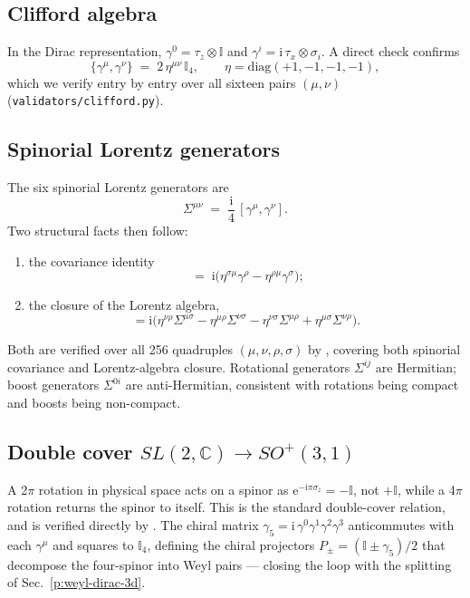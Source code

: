 \documentclass[a4paper,onecolumn,11pt]{quantumarticle}
\newcommand{\ii}{\ensuremath{\mathrm{i}}}
\newcommand{\bbI}{\ensuremath{\mathbb{I}}}
\newcommand{\bbC}{\ensuremath{\mathbb{C}}}
\begin{document}
\subsection{Clifford algebra}
In the Dirac representation, $\gamma^{0} = \tau_{z}\otimes\bbI$ and
$\gamma^{i} = \ii\,\tau_{x}\otimes\sigma_{i}$. A direct check confirms
\begin{equation}
\{\gamma^{\mu},\gamma^{\nu}\}\;=\;2\,\eta^{\mu\nu}\,\bbI_{4} ,
\qquad \eta=\mathrm{diag}(+1,-1,-1,-1) ,
\label{p:eq:clifford}
\end{equation}
which we verify entry by entry over all sixteen pairs $(\mu,\nu)$
(\texttt{validators/clifford.py}).

\subsection{Spinorial Lorentz generators}
The six spinorial Lorentz generators are
\begin{equation}
\Sigma^{\mu\nu} \;=\; \frac{\ii}{4}\,[\gamma^{\mu},\gamma^{\nu}] .
\end{equation}
Two structural facts then follow:
\begin{enumerate}[leftmargin=*]
\item the covariance identity
\begin{equation}
[\Sigma^{\rho\sigma},\,\gamma^{\mu}]
\;=\;\ii\bigl(\eta^{\sigma\mu}\gamma^{\rho}-\eta^{\rho\mu}\gamma^{\sigma}\bigr) ;
\label{p:eq:cov-id}
\end{equation}
\item the closure of the Lorentz algebra,
\begin{equation}
[\Sigma^{\mu\nu},\Sigma^{\rho\sigma}] = \ii\bigl(
  \eta^{\nu\rho}\Sigma^{\mu\sigma}-\eta^{\mu\rho}\Sigma^{\nu\sigma}
 -\eta^{\nu\sigma}\Sigma^{\mu\rho}+\eta^{\mu\sigma}\Sigma^{\nu\rho}\bigr).
\label{p:eq:lorentz-closure}
\end{equation}
\end{enumerate}
Both are verified over all 256 quadruples $(\mu,\nu,\rho,\sigma)$ by
, covering both spinorial covariance and
Lorentz-algebra closure. Rotational generators
$\Sigma^{ij}$ are Hermitian; boost generators $\Sigma^{0i}$ are
anti-Hermitian, consistent with rotations being compact and boosts being
non-compact.

\subsection{Double cover \texorpdfstring{$SL(2,\bbC)\!\to\!SO^{+}(3,1)$}{SL(2,C) to SO+(3,1)}}
A 2$\pi$ rotation in physical space acts on a spinor as
$\mathrm{e}^{-\ii\pi\sigma_{z}} = -\bbI$, not $+\bbI$, while a 4$\pi$
rotation returns the spinor to itself. This is the standard double-cover
relation, and is verified directly by
. The chiral matrix
$\gamma_{5} = \ii\,\gamma^{0}\gamma^{1}\gamma^{2}\gamma^{3}$ anticommutes
with each $\gamma^{\mu}$ and squares to $\bbI_{4}$, defining the chiral
projectors $P_{\pm}=(\bbI\pm\gamma_{5})/2$ that decompose the four-spinor
into Weyl pairs --- closing the loop with the splitting of
Sec.~\ref{p:weyl-dirac-3d}.
\end{document}
